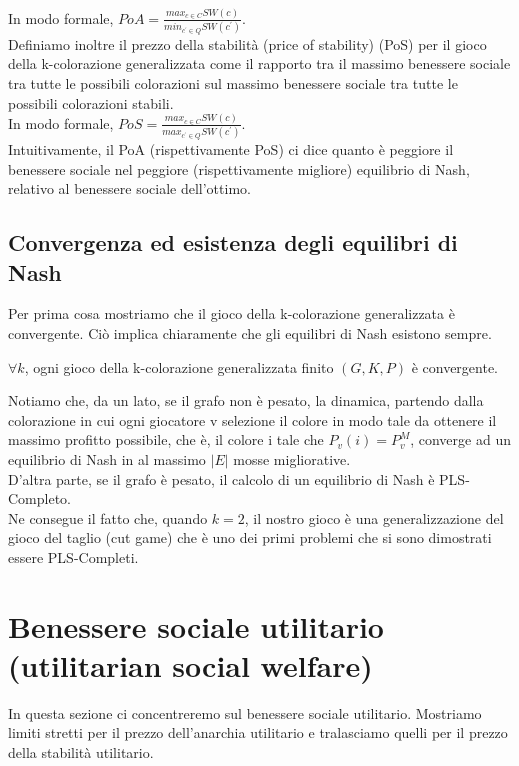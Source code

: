 In modo formale, \(PoA = \frac{max_{c \in C} SW(c)}{min_{c^{\prime} \in Q} SW(c^{\prime})}\).\\

Definiamo inoltre il prezzo della stabilità (price of stability) (PoS) per il gioco della k-colorazione generalizzata come il rapporto tra il massimo benessere sociale tra tutte le possibili colorazioni sul massimo benessere sociale tra tutte le possibili colorazioni stabili.\\
In modo formale, \(PoS = \frac{max_{c \in C} SW(c)}{max_{c^{\prime} \in Q} SW(c^{\prime})}\).\\

Intuitivamente, il PoA (rispettivamente PoS) ci dice quanto è peggiore il benessere sociale nel peggiore (rispettivamente migliore) equilibrio di Nash, relativo al benessere sociale dell'ottimo.\\

\subsection{Convergenza ed esistenza degli equilibri di Nash}
\justify
Per prima cosa mostriamo che il gioco della k-colorazione generalizzata è convergente. Ciò implica chiaramente che gli equilibri di Nash esistono sempre.\\

\begin{prop}
\label{proposition1}
	\(\forall k\), ogni gioco della k-colorazione generalizzata finito \((G, K, P)\) è convergente.
\end{prop}

Notiamo che, da un lato, se il grafo non è pesato, la dinamica, partendo dalla colorazione in cui ogni giocatore v selezione il colore in modo tale da ottenere il massimo profitto possibile, che è, il colore i tale che \(P_v (i) = P_v^M\), converge ad un equilibrio di Nash in al massimo \(|E|\) mosse migliorative.\\

D'altra parte, se il grafo è pesato, il calcolo di un equilibrio di Nash è PLS-Completo.\\

Ne consegue il fatto che, quando \(k = 2\), il nostro gioco è una generalizzazione del gioco del taglio (cut game) che è uno dei primi problemi che si sono dimostrati essere PLS-Completi.\\

\section{Benessere sociale utilitario (utilitarian social welfare)}
\justify
In questa sezione ci concentreremo sul benessere sociale utilitario. Mostriamo limiti stretti per il prezzo dell'anarchia utilitario e tralasciamo quelli per il prezzo della stabilità utilitario.\\

